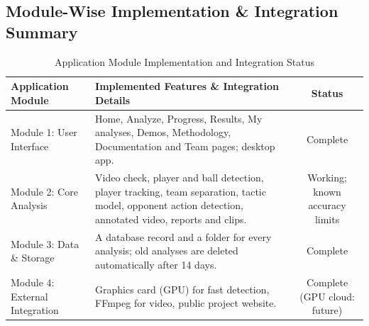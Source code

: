\documentclass[11pt, a4paper]{article}
\begin{document}
\subsection{Module-Wise Implementation \& Integration Summary}
\begin{table}[H]
    \centering
    \footnotesize
    \renewcommand{\arraystretch}{1.25}
    \begin{tabular}{|p{3.5cm}|p{7.8cm}|c|}
        \hline
        \textbf{Application Module} & \textbf{Implemented Features \& Integration Details} & \textbf{Status} \\
        \hline
        Module 1: User Interface & Home, Analyze, Progress, Results, My analyses, Demos, Methodology, Documentation and Team pages; desktop app. & Complete \\
        \hline
        Module 2: Core Analysis & Video check, player and ball detection, player tracking, team separation, tactic model, opponent action detection, annotated video, reports and clips. & Working; known accuracy limits \\
        \hline
        Module 3: Data \& Storage & A database record and a folder for every analysis; old analyses are deleted automatically after 14 days. & Complete \\
        \hline
        Module 4: External Integration & Graphics card (GPU) for fast detection, FFmpeg for video, public project website. & Complete (GPU cloud: future) \\
        \hline
    \end{tabular}
    \caption{Application Module Implementation and Integration Status}
\end{table}
\end{document}
